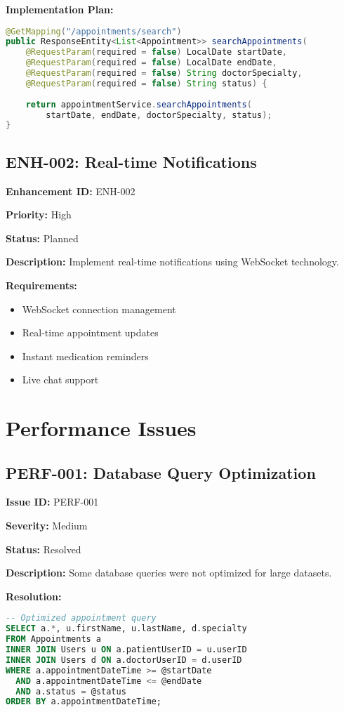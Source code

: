 \documentclass[12pt,a4paper]{article}
\begin{document}
\textbf{Implementation Plan:}
\begin{lstlisting}[language=Java, caption=Search Filter Implementation]
@GetMapping("/appointments/search")
public ResponseEntity<List<Appointment>> searchAppointments(
    @RequestParam(required = false) LocalDate startDate,
    @RequestParam(required = false) LocalDate endDate,
    @RequestParam(required = false) String doctorSpecialty,
    @RequestParam(required = false) String status) {
    
    return appointmentService.searchAppointments(
        startDate, endDate, doctorSpecialty, status);
}
\end{lstlisting}

\subsection{ENH-002: Real-time Notifications}

\textbf{Enhancement ID:} ENH-002

\textbf{Priority:} High

\textbf{Status:} Planned

\textbf{Description:} Implement real-time notifications using WebSocket technology.

\textbf{Requirements:}
\begin{itemize}
    \item WebSocket connection management
    \item Real-time appointment updates
    \item Instant medication reminders
    \item Live chat support
\end{itemize}

\section{Performance Issues}

\subsection{PERF-001: Database Query Optimization}

\textbf{Issue ID:} PERF-001

\textbf{Severity:} Medium

\textbf{Status:} Resolved

\textbf{Description:} Some database queries were not optimized for large datasets.

\textbf{Resolution:}
\begin{lstlisting}[language=SQL, caption=Query Optimization]
-- Optimized appointment query
SELECT a.*, u.firstName, u.lastName, d.specialty
FROM Appointments a
INNER JOIN Users u ON a.patientUserID = u.userID
INNER JOIN Users d ON a.doctorUserID = d.userID
WHERE a.appointmentDateTime >= @startDate
  AND a.appointmentDateTime <= @endDate
  AND a.status = @status
ORDER BY a.appointmentDateTime;
\end{lstlisting}
\end{document}
